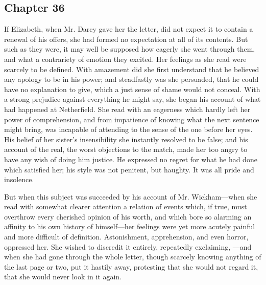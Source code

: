 
\subsection[chapter-36]{\useURL[url36][][][]\from[url36] Chapter 36}

If Elizabeth, when Mr. Darcy gave her the letter, did not expect it to contain a renewal of his offers, she had formed no expectation at all of its contents. But such as they were, it may well be supposed how eagerly she went through them, and what a contrariety of emotion they excited. Her feelings as she read were scarcely to be defined. With amazement did she first understand that he believed any apology to be in his power; and steadfastly was she persuaded, that he could have no explanation to give, which a just sense of shame would not conceal. With a strong prejudice against everything he might say, she began his account of what had happened at Netherfield. She read with an eagerness which hardly left her power of comprehension, and from impatience of knowing what the next sentence might bring, was incapable of attending to the sense of the one before her eyes. His belief of her sister's insensibility she instantly resolved to be false; and his account of the real, the worst objections to the match, made her too angry to have any wish of doing him justice. He expressed no regret for what he had done which satisfied her; his style was not penitent, but haughty. It was all pride and insolence.

But when this subject was succeeded by his account of Mr. Wickham---when she read with somewhat clearer attention a relation of events which, if true, must overthrow every cherished opinion of his worth, and which bore so alarming an affinity to his own history of himself---her feelings were yet more acutely painful and more difficult of definition. Astonishment, apprehension, and even horror, oppressed her. She wished to discredit it entirely, repeatedly exclaiming, ---and when she had gone through the whole letter, though scarcely knowing anything of the last page or two, put it hastily away, protesting that she would not regard it, that she would never look in it again.

